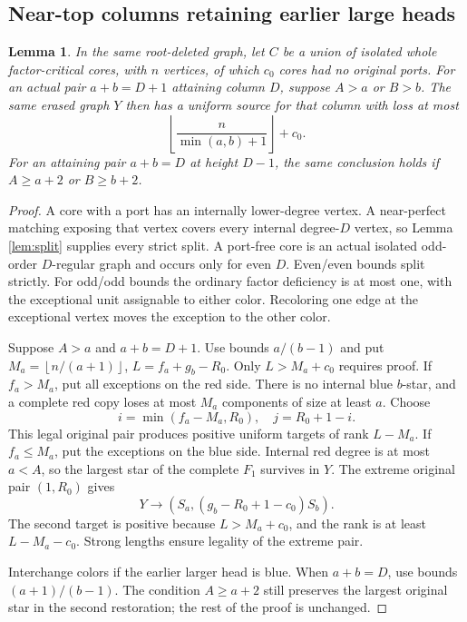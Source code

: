 \documentclass[11pt,a4paper]{article}
\newcommand{\floor}[1]{\left\lfloor#1\right\rfloor}
\newtheorem{lemma}[theorem]{Lemma}
\theoremstyle{definition}
\begin{document}
\subsection{Near-top columns retaining earlier large heads}
\begin{lemma}\label{lem:near-top}
In the same root-deleted graph, let $C$ be a union of isolated whole factor-critical cores, with $n$ vertices, of which $c_0$ cores had no original ports. For an actual pair $a+b=D+1$ attaining column $D$, suppose $A>a$ or $B>b$. The same erased graph $Y$ then has a uniform source for that column with loss at most
\[
\floor{\frac n{\min(a,b)+1}}+c_0.
\]
For an attaining pair $a+b=D$ at height $D-1$, the same conclusion holds if $A\ge a+2$ or $B\ge b+2$.
\end{lemma}
\begin{proof}
A core with a port has an internally lower-degree vertex. A near-perfect matching exposing that vertex covers every internal degree-$D$ vertex, so Lemma \ref{lem:split} supplies every strict split. A port-free core is an actual isolated odd-order $D$-regular graph and occurs only for even $D$. Even/even bounds split strictly. For odd/odd bounds the ordinary factor deficiency is at most one, with the exceptional unit assignable to either color. Recoloring one edge at the exceptional vertex moves the exception to the other color.

Suppose $A>a$ and $a+b=D+1$. Use bounds $a/(b-1)$ and put $M_a=\floor{n/(a+1)}$, $L=f_a+g_b-R_0$. Only $L>M_a+c_0$ requires proof.
If $f_a>M_a$, put all exceptions on the red side. There is no internal blue $b$-star, and a complete red copy loses at most $M_a$ components of size at least $a$. Choose
\[
i=\min(f_a-M_a,R_0),\quad j=R_0+1-i.
\]
This legal original pair produces positive uniform targets of rank $L-M_a$.
If $f_a\le M_a$, put the exceptions on the blue side. Internal red degree is at most $a<A$, so the largest star of the complete $F_1$ survives in $Y$. The extreme original pair $(1,R_0)$ gives
\[
Y\to\left(S_a,(g_b-R_0+1-c_0)S_b\right).
\]
The second target is positive because $L>M_a+c_0$, and the rank is at least $L-M_a-c_0$. Strong lengths ensure legality of the extreme pair.

Interchange colors if the earlier larger head is blue. When $a+b=D$, use bounds $(a+1)/(b-1)$. The condition $A\ge a+2$ still preserves the largest original star in the second restoration; the rest of the proof is unchanged.
\end{proof}
\end{document}
